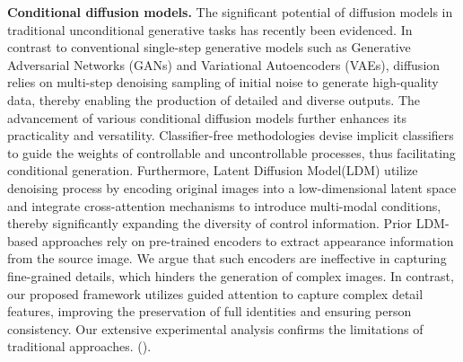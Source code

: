 \textbf{Conditional diffusion models.}
The significant potential of diffusion models in traditional unconditional generative tasks has recently been evidenced\cite{ho2020denoising,song2020denoising,song2020score}. 
In contrast to conventional single-step generative models such as Generative Adversarial Networks (GANs)\cite{mirza2014conditional} and Variational Autoencoders (VAEs)\cite{kingma2013auto}, diffusion relies on multi-step denoising sampling of initial noise to generate high-quality data, thereby enabling the production of detailed and diverse outputs. The advancement of various conditional diffusion models further enhances its practicality and versatility. Classifier-free methodologies devise implicit classifiers to guide the weights of controllable and uncontrollable processes, thus facilitating conditional generation\cite{ho2022classifier}. Furthermore, Latent Diffusion Model(LDM)\cite{rombach2022high} utilize denoising process by encoding original images into a low-dimensional latent space and integrate cross-attention mechanisms to introduce multi-modal conditions, thereby significantly expanding the diversity of control information. 
Prior LDM-based approaches\cite{han2023controllable,shen2024advancing,lu2024coarse} rely on pre-trained encoders to extract appearance information from the source image. 
We argue that such encoders are ineffective in capturing fine-grained details, which hinders the generation of complex images. In contrast, our proposed framework utilizes guided attention to capture complex detail features, improving the preservation of full identities and ensuring person consistency.
Our extensive experimental analysis confirms the limitations of traditional approaches. ().
